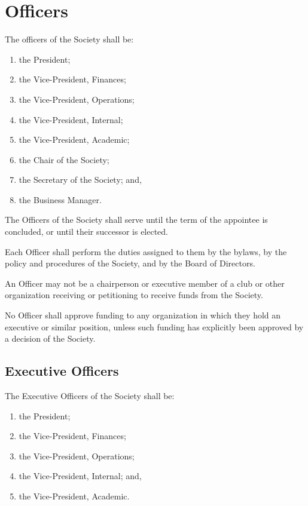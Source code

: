 \section{Officers}

The officers of the Society shall be:
\begin{enumerate}
    \item the President; 
    \item the Vice-President, Finances; 
    \item the Vice-President, Operations; 
    \item the Vice-President, Internal;
    \item the Vice-President, Academic;
    \item the Chair of the Society;
    \item the Secretary of the Society; and,
    \item the Business Manager.
\end{enumerate}

The Officers of the Society shall serve until the term of the appointee is
concluded, or until their successor is elected. 

Each Officer shall perform the duties assigned to them by the bylaws, by the
policy and procedures of the Society, and by the Board of Directors.

An Officer may not be a chairperson or executive member of a club or other 
organization receiving or petitioning to receive funds from the Society. 

No Officer shall approve funding to any organization in which they hold an
executive or similar position, unless such funding has explicitly been approved
by a decision of the Society.

\subsection{Executive Officers}
The Executive Officers of the Society shall be: \begin{enumerate}
    \item the President; 
    \item the Vice-President, Finances; 
    \item the Vice-President, Operations; 
    \item the Vice-President, Internal; and,
    \item the Vice-President, Academic.
\end{enumerate}

